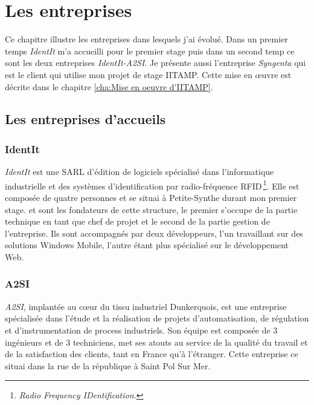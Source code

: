 \chapter{Les entreprises} %
\label{cha:Les entreprises}


\begin{it}

Ce chapitre illustre les entreprises dans lesquels j'ai évolué. Dans un
premier temps \emph{IdentIt} m'a accueilli pour le premier stage puis
dans un second temp ce sont les deux entreprises \emph{IdentIt-A2SI}. Je
présente aussi l'entreprise \emph{Syngenta} qui est le client qui
utilise mon projet de stage IITAMP. Cette mise en \oe{}uvre est décrite
dans le chapitre \ref{cha:Mise en oeuvre d'IITAMP}.

\end{it}

\section{Les entreprises d'accueils} %
\label{sec:Les entreprises d'accueils}

\subsection{IdentIt} %
\label{sub:IdentIt}

\emph{IdentIt} est une SARL d'édition de logiciels spécialisé dans
l'informatique industrielle et des systèmes d'identification par
radio-fréquence RFID\,\footnote{\emph{Radio Frequency IDentification.}}.
Elle est composée de quatre personnes et se situai à Petite-Synthe
durant mon premier stage.  et  sont les
fondateurs de cette structure, le premier s'occupe de la partie
technique en tant que chef de projet et le second de la partie gestion
de l'entreprise. Ils sont accompagnés par deux développeurs, l'un
travaillant sur des solutions Windows Mobile, l'autre étant plus
spécialisé sur le développement Web.


\subsection{A2SI} %
\label{sub:A2SI}

\emph{A2SI}, implantée au c\oe{}ur du tissu industriel Dunkerquois, est une
entreprise spécialisée dans l’étude et la réalisation de projets
d’automatisation, de régulation et d’instrumentation de process
industriels. Son équipe est composée de 3 ingénieurs et de 3
techniciens, met ses atouts au service de la qualité du travail et de la
satisfaction des clients, tant en France qu’à l’étranger. Cette
entreprise ce situai dans la rue de la république à Saint Pol Sur Mer.

